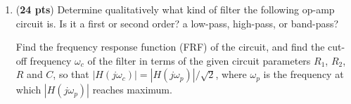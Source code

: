 \begin{enumerate}
\begin{comment}
  {\bf Solution:}

  \[
  I_C \uparrow \Longrightarrow V_C \downarrow
  \Longrightarrow I_B \downarrow \Longrightarrow I_C \downarrow 
  \]

  \[
  I_B=\frac{V_{CC}-0.7}{(\beta+1)R_C+R_B},\;\;\;\;\;
  I_C=\beta I_B=\frac{\beta(V_{CC}-0.7)}{(\beta+1)R_C+R_B} 
  \]
  $I_C=2mA$, $V_C=5V$,  $R_C=(V_{CC}-V_C)/I_C=5V/2mA=2.5K\Omega$,  
  $I_B=I_C/\beta=0.02mA$,  $R_B=(5-0.7)/0.02=4.3/0.02=215K\Omega$.

  \[
  I_B=\frac{V_{CC}-0.7}{(\beta+1)R_C+R_B}=\frac{9.3}{101\times 2.5K+215}
  =0.02mA
  \]

  \[
  I_C=\beta I_B=2 mA,\;\;\;V_C=V_{CC}-(\beta+1)I_B=5V 
  \]

  \[
  I_C=\beta I_B=2.6mA,\;\;\;V_C=V_{CC}-(\beta+1)I_B=3.5V 
  \]
  \end{comment}

\item ({\bf 24 pts})
  Determine qualitatively what kind of filter the following op-amp
  circuit is. Is it a first or second order? a low-pass, high-pass, or 
  band-pass? 

  Find the frequency response function (FRF) of the circuit, and find the
  cut-off frequency $\omega_c$ of the filter in terms of the given circuit
  parameters $R_1$, $R_2$, $R$ and $C$, so that
  $|H(j\omega_c)|=|H(j\omega_p)|/\sqrt{2}$, where $\omega_p$ is the
  frequency at which $|H(j\omega_p)|$ reaches maximum.


  \begin{comment}

  {\bf Solution:} Let $v^+\approx v^-=v$
  \[
  v=v_{out}\frac{R_1}{R_1+R_2},\;\;\;\;\;\;\;\;\;\;\frac{v_{in}-v}{R}
  =\frac{v}{1/j\omega C}=v\;j\omega C
  \]
  Substituting $v$ in the first equation into the second, we find
  \[
  H(j\omega)=\frac{v_{out}}{v_{in}}=\frac{R_1+R_2}{R_1}\;\frac{1}{j\omega RC+1}
  \]
  This is a first-order low-pass filter with cut-off frequency $\omega_c=1/RC$.
  \end{comment}


\end{enumerate}


